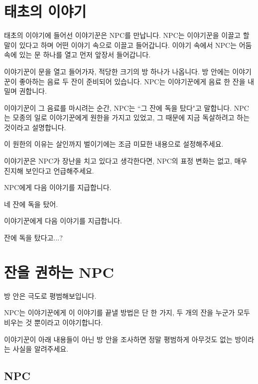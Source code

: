 \documentclass{report}
\begin{document}
	\section{태초의 이야기}
	태초의 이야기에 들어선 이야기꾼은 NPC를 만납니다. NPC는 이야기꾼을 이끌고 할 말이 있다고 하며 어떤 이야기 속으로 이끌고 들어갑니다. 이야기 속에서 NPC는 어둠 속에 있는 문 하나를 열고 먼저 앞장서 들어갑니다.
	
	이야기꾼이 문을 열고 들어가자, 적당한 크기의 방 하나가 나옵니다. 방 안에는 이야기꾼이 좋아하는 음료 두 잔이 준비되어 있습니다. NPC는 이야기꾼에게 음료 한 잔을 내밀며 권합니다.
	
	이야기꾼이 그 음료를 마시려는 순간, NPC는 ``그 잔에 독을 탔다"고 말합니다. NPC는 모종의 일로 이야기꾼에게 원한을 가지고 있었고, 그 때문에 지금 독살하려고 하는 것이라고 설명합니다.
	
	이 원한의 이유는 살인까지 벌이기에는 조금 미묘한 내용으로 설정해주세요.
	
	이야기꾼은 NPC가 장난을 치고 있다고 생각한다면, NPC의 표정 변화는 없고, 매우 진지해 보인다고 언급해주세요.
	
	NPC에게 다음 이야기를 지급합니다.
	
	\begin{lite}{네 잔에 독을 탔어.}
	\end{lite}
	
	이야기꾼에게 다음 이야기를 지급합니다.
	
	\begin{lite}{잔에 독을 탔다고...?}
	\end{lite}
	
	\section{잔을 권하는 NPC}
	
	방 안은 극도로 평범해보입니다.
	
	NPC는 이야기꾼에게 이 이야기를 끝낼 방법은 단 한 가지, 두 개의 잔을 누군가 모두 비우는 것 뿐이라고 이야기합니다.
	
	이야기꾼이 아래 내용들이 아닌 방 안을 조사하면 정말 평범하게 아무것도 없는 방이라는 사실을 알려주세요.
	
	\subsection{NPC}
	
\end{document}
